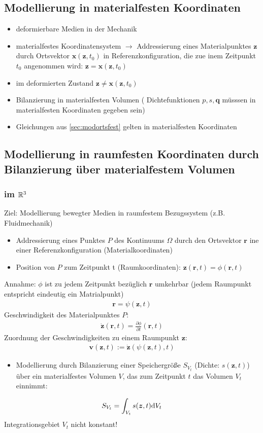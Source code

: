  \subsection{Modellierung in materialfesten Koordinaten}
 \begin{itemize}
 \item deformierbare Medien in der Mechanik
 \item materialfestes Koordinatensystem 
 \subitem $\rightarrow$ Addressierung eines Materialpunktes $\bm{z}$ durch Ortsvektor $\bm{x}(\bm{z},t_0)$ in Referenzkonfiguration, die zue inem Zeitpunkt $t_0$ angenommen wird: $\bm{z}=\bm{x}(\bm{z},t_0)$
 \item im deformierten Zustand $\bm{z}\neq\bm{x}(\bm{z},t_0)$
 \item Bilanzierung in materialfesten Volumen ( Dichtefunktionen $p,s,\bm{q}$ müsssen in materialfesten Koordinaten gegeben sein)
 \item Gleichungen aus \ref{sec:modortsfest} gelten in materialfesten Koordinaten
 \end{itemize}
 \subsection{Modellierung in raumfesten Koordinaten durch Bilanzierung über materialfestem Volumen}
 \subsubsection{im $\mathbb{R}^3$}
 Ziel: Modellierung bewegter Medien in raumfestem Bezugssystem (z.B. Fluidmechanik)
 \begin{itemize}
  \item Addressierung eines Punktes $P$ des Kontinuums $\Omega$ durch den Ortsvektor $\bm{r}$ ine einer Referenzkonfiguration (Materialkoordinaten)
  \item Position von $P$ zum Zeitpunkt t (Raumkoordinaten): $\bm{z}(\bm{r},t) = \phi(\bm{r},t)$ 
 \end{itemize}

Annahme: $\phi$ ist zu jedem Zeitpunkt bezüglich $\bm{r}$ umkehrbar (jedem Raumpunkt entspricht eindeutig ein Matrialpunkt)
\begin{align*}
\bm{r} = \psi(\bm{z},t)
\end{align*}
Geschwindigkeit des Materialpunktes $P$:
\begin{align*}
\dot{\bm{z}}(\bm{r},t) = \frac{\partial \phi}{\partial t}(\bm{r},t)
\end{align*}
Zuordnung der Geschwindigkeiten zu einem Raumpunkt $\bm{z}$:
\begin{align*}
\bm{v}(\bm{z},t) := \dot{\bm{z}}(\psi(\bm{z},t),t)
\end{align*}
\begin{itemize}
\item Modellierung durch Bilanzierung einer Speichergröße $S_{V_t}$ (Dichte: $s(\bm{z},t)$) über ein materialfestes Volumen $V$, das zum Zeitpunkt $t$ das Volumen $V_t$ einnimmt:
\end{itemize}
\begin{align*}
S_{V_t} = \int_{V_t} s(\bm{z},t) \mathrm{d} V_t
\end{align*}
Integrationsgebiet $V_t$ nicht konstant! 

